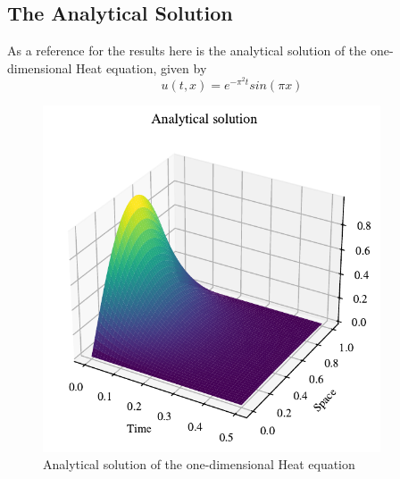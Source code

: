 \documentclass{article}
\theoremstyle{definition}
\begin{document}
\subsection{The Analytical Solution}
As a reference for the results here is the analytical solution of the one-dimensional Heat equation, given by
\[
u(t,x) = e^{-\pi^2 t}sin(\pi x)
\]

\begin{figure}[H]%
    \centering
    \includegraphics[width=10cm]{Project3/figures/1dHeat/Analytical_sol.pdf}
    \caption{Analytical solution of the one-dimensional Heat equation }
    \label{fig:Analytic}
\end{figure}
\end{document}
